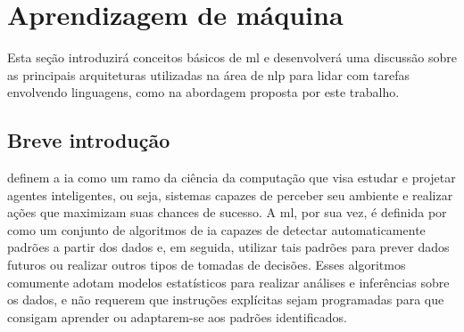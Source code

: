 \section{Aprendizagem de máquina}
\label{sec:am}

Esta seção introduzirá conceitos básicos de \acrfull{ml} e desenvolverá uma discussão sobre as principais arquiteturas utilizadas na área de \acrfull{nlp} para lidar com tarefas envolvendo linguagens, como na abordagem proposta por este trabalho.


\subsection{Breve introdução}
\label{sec:am-introducao}

 definem a \acrfull{ia} como um ramo da ciência da computação que visa estudar e projetar agentes inteligentes, ou seja, sistemas capazes de perceber seu ambiente e realizar ações que maximizam suas chances de sucesso.
A \acrfull{ml}, por sua vez, é definida por  como um conjunto de algoritmos de \acrshort{ia} capazes de detectar automaticamente padrões a partir dos dados e, em seguida, utilizar tais padrões para prever dados futuros ou realizar outros tipos de tomadas de decisões.
Esses algoritmos comumente adotam modelos estatísticos para realizar análises e inferências sobre os dados, e não requerem que instruções explícitas sejam programadas para que consigam aprender ou adaptarem-se aos padrões identificados.




